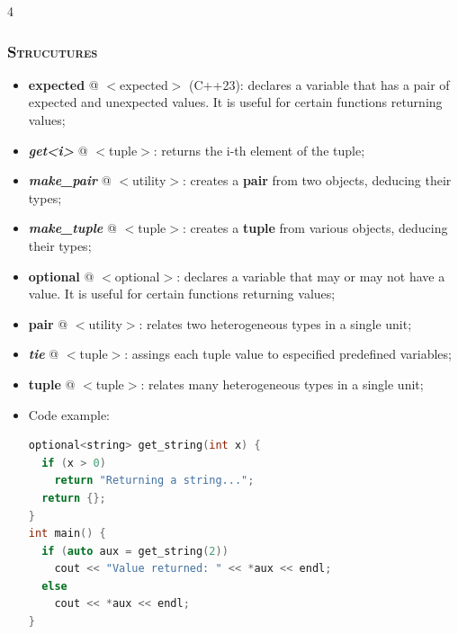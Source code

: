 \documentclass[10pt]{article}
\begin{document}
\begin{multicols*}{4}
{{\subsubsection*{\textsc{Strucutures}} 
\begin{itemize}[leftmargin=*,topsep=0.25pt]
  \setlength\itemsep{-1.8pt}
\item  {\textbf{expected}} @ $<$expected$>$ (C++23): declares a variable that has a pair of expected and unexpected values. It is useful for certain functions returning values;
\item  \emph{{\textbf{get<i>}}} @ $<$tuple$>$: returns the i-th element of the tuple;  
\item  \emph{\textbf{make\_pair}} @ $<$utility$>$: creates a \textbf{pair} from two objects, deducing their types; 
\item  \emph{\textbf{make\_tuple}} @ $<$tuple$>$: creates a \textbf{tuple} from various objects, deducing their types; 
\item  {\textbf{optional}} @ $<$optional$>$: declares a variable that may or may not have a value. It is useful for certain functions returning values;
\item  {\textbf{pair}} @ $<$utility$>$: relates two heterogeneous types in a single unit; 
\item  \emph{\textbf{tie}} @ $<$tuple$>$: assings each tuple value to especified predefined variables; 
\item  {\textbf{tuple}} @ $<$tuple$>$: relates many heterogeneous types in a single unit;
\item Code example:
{\selectfont \lstset{style=mystyle}
 \begin{lstlisting}[language=C++]
optional<string> get_string(int x) {
  if (x > 0)
    return "Returning a string...";
  return {};
}
int main() {
  if (auto aux = get_string(2))
    cout << "Value returned: " << *aux << endl;
  else
    cout << *aux << endl;
}
\end{lstlisting}
 }
\end{itemize}

}}
\end{multicols*}
\end{document}
